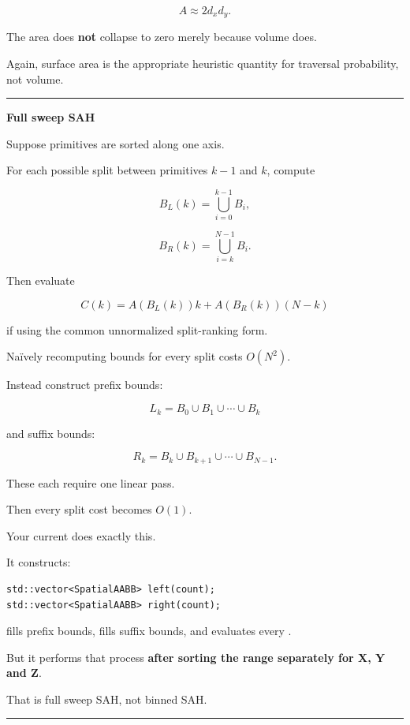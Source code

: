 \[
A\approx2d_xd_y.
\]

The area does \textbf{not} collapse to zero merely because volume does.

Again, surface area is the appropriate heuristic quantity for traversal probability, not volume.

\begin{center}\rule{0.5\linewidth}{0.5pt}\end{center}

\textbf{Full sweep SAH}

Suppose primitives are sorted along one axis.

For each possible split between primitives \(k-1\) and \(k\), compute

\[
B_L(k)
=
\bigcup_{i=0}^{k-1}B_i,
\]

\[
B_R(k)
=
\bigcup_{i=k}^{N-1}B_i.
\]

Then evaluate

\[
C(k)
=
A(B_L(k))k+
A(B_R(k))(N-k)
\]

if using the common unnormalized split-ranking form.

Naïvely recomputing bounds for every split costs \(O(N^2)\).

Instead construct prefix bounds:

\[
L_k=B_0\cup B_1\cup\cdots\cup B_k
\]

and suffix bounds:

\[
R_k=B_k\cup B_{k+1}\cup\cdots\cup B_{N-1}.
\]

These each require one linear pass.

Then every split cost becomes \(O(1)\).

Your current  does exactly this.

It constructs:

\begin{verbatim}
std::vector<SpatialAABB> left(count);
std::vector<SpatialAABB> right(count);
\end{verbatim}

fills prefix bounds, fills suffix bounds, and evaluates every .

But it performs that process \textbf{after sorting the range separately for X, Y and Z}.

That is full sweep SAH, not binned SAH.

\begin{center}\rule{0.5\linewidth}{0.5pt}\end{center}


